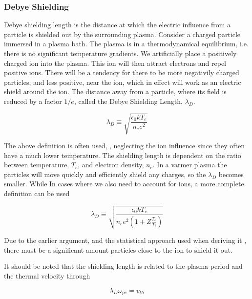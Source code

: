 		\subsubsection{Debye Shielding}
		Debye shielding length is the distance at which the electric influence
		from a particle is shielded out by the surrounding plasma.
		Consider a charged particle immersed in a plasma bath. The plasma is in
		a thermodynamical equilibrium, i.e. there is no significant temperature
		gradients. We artificially place a positively charged ion into the plasma.
		This ion will then attract electrons and repel positive ions. There will be a tendency
		for there to be more negativily charged particles, and less positive, near the
		ion, which in effect will work as an electric shield around the ion. The
		distance away from a particle, where its field is reduced by a factor \(1/e\), called the Debye Shielding Length, \(\lambda_D\).

		\begin{equation}
			\lambda_D \equiv \sqrt{\frac{\epsilon_0 kT_e}{n_e e^2}}
		\end{equation}

		The above definition is often used, \citep{pecseli_waves_2012},
		neglecting the ion influence since they often have a much lower temperature.
		The shielding length is dependent on the ratio between temperature, \(T_e\),
		and electron density, \(n_e\). In a varmer plasma the particles will move quickly
		and efficiently shield any charges, so the \(\lambda_D\) becomes smaller. While
		In cases where we also need to account for ions, a more complete definition can be used

		\begin{equation}
			\lambda_D \equiv \sqrt{\frac{\epsilon_0 k T_e}{n_e e^2(1+Z \frac{T_e}{T_i})}}
		\end{equation}

		Due to the earlier argument, and the statistical approach used when deriving it \citep{goldston_introduction_1995},
		there must be a significant amount particles close to the ion to shield it out.

		It should be noted that the shielding length is related \citep{fitzpatrick_plasma_2014} to
		the plasma period and the thermal velocity through

		\begin{equation}
			\lambda_D \omega_{pe} = v_{th}
		\end{equation}


